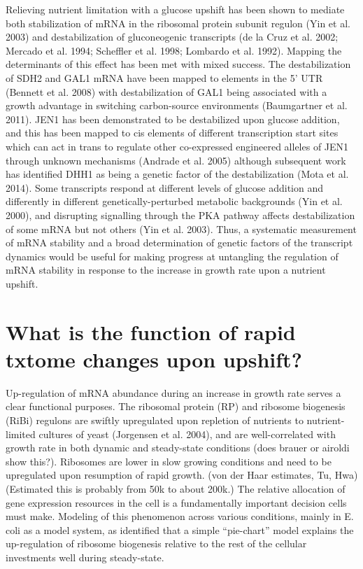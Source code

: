 Relieving nutrient limitation with a glucose upshift has
been shown to mediate both stabilization of mRNA in the ribosomal
protein subunit regulon (Yin et al. 2003) and destabilization of
gluconeogenic transcripts (de la Cruz et al. 2002; Mercado et al.
1994; Scheffler et al. 1998; Lombardo et al. 1992). Mapping the
determinants of this effect has been met with mixed success. The
destabilization of SDH2 and GAL1 mRNA have been mapped to elements in
the 5’ UTR (Bennett et al. 2008) with destabilization of GAL1 being
associated with a growth advantage in switching carbon-source
environments (Baumgartner et al. 2011). JEN1 has been demonstrated to
be destabilized upon glucose addition, and this has been mapped to cis
elements of different transcription start sites which can act in trans
to regulate other co-expressed engineered alleles of JEN1 through
unknown mechanisms (Andrade et al. 2005) although subsequent work has
identified DHH1 as being a genetic factor of the destabilization (Mota
et al. 2014). Some transcripts respond at different levels of glucose
addition and differently in different genetically-perturbed metabolic
backgrounds (Yin et al. 2000), and disrupting signalling through the
PKA pathway affects destabilization of some mRNA but not others (Yin
et al. 2003). Thus, a systematic measurement of mRNA stability and a
broad determination of genetic factors of the transcript dynamics
would be useful for making progress at untangling the regulation of
mRNA stability in response to the increase in growth rate upon a
nutrient upshift.  

\section{What is the function of rapid txtome changes upon upshift?}

Up-regulation of mRNA abundance during an increase in growth
rate serves a clear functional purposes. The ribosomal protein (RP)
and ribosome biogenesis (RiBi) regulons are swiftly upregulated upon
repletion of nutrients to nutrient-limited cultures of yeast
(Jorgensen et al. 2004), and are well-correlated with growth rate in
both dynamic and steady-state conditions (does brauer or airoldi show
this?). Ribosomes are lower in slow growing conditions and need to be
upregulated upon resumption of rapid growth. (von der Haar estimates,
Tu, Hwa) (Estimated this is probably from 50k to about 200k.) The
relative allocation of gene expression resources in the cell is a
fundamentally important decision cells must make. Modeling of this
phenomenon across various conditions, mainly in E. coli as a model
system, as identified that a simple “pie-chart” model explains the
up-regulation of ribosome biogenesis relative to the rest of the
cellular investments well during steady-state.  

